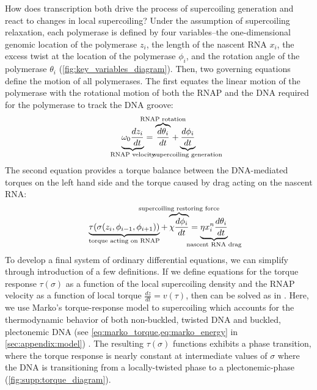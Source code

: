 \documentclass[11pt]{article}
\begin{document}
How does transcription both drive the process of supercoiling generation and react to changes in local supercoiling? Under the assumption of supercoiling relaxation, each polymerase is defined by four variables--the one-dimensional genomic location of the polymerase \(z_i\), the length of the nascent RNA \(x_i\), the excess twist at the location of the polymerase \(\phi_i\), and the rotation angle of the polymerase \(\theta_i\) (\cref{fig:key_variables_diagram}). Then, two governing equations define the motion of all polymerases.\parencite{sevierPropertiesGeneExpression2018} The first equates the linear motion of the polymerase with the rotational motion of both the RNAP and the DNA required for the polymerase to track the DNA groove:
\begin{equation}
    \underbrace{\omega_0 \frac{dz_i}{dt}}_{\mathclap{\text{RNAP velocity}}} = \overbrace{\frac{d\theta_i}{dt}}^{\mathclap{\text{RNAP rotation}}} + \underbrace{\frac{d\phi_i}{dt}}_{\mathclap{\text{supercoiling generation}}}
\label{eq:linear_rotational_balance}
\end{equation}
The second equation provides a torque balance between the DNA-mediated torques on the left hand side and the torque caused by drag acting on the nascent RNA:
\begin{equation}
    \underbrace{\tau(\sigma(z_i, \phi_{i-1}, \phi_{i+1}))}_{\mathclap{\text{torque acting on RNAP}}} + \overbrace{\chi \frac{d\phi_i}{dt}}^{\mathclap{\text{supercoiling restoring force}}}= \underbrace{\eta x_i^n \frac{d\theta_i}{dt}}_{\mathclap{\text{nascent RNA drag}}}
\label{eq:torque_balance}
\end{equation}
To develop a final system of ordinary differential equations, we can simplify through introduction of a few definitions. If we define equations for the torque response \(\tau(\sigma)\) as a function of the local supercoiling density and the RNAP velocity as a function of local torque \(\frac{dz}{dt} = v(\tau)\), then  can be solved as in \textcite{sevierPropertiesGeneExpression2018}. Here, we use Marko's torque-response model to supercoiling which accounts for the thermodynamic behavior of both non-buckled, twisted DNA and buckled, plectonemic DNA (see \cref{eq:marko_torque,eq:marko_energy} in \cref{sec:appendix:model}) \parencite{markoTorqueDynamicsLinking2007}. The resulting \(\tau(\sigma)\) functions exhibits a phase transition, where the torque response is nearly constant at intermediate values of \(\sigma\) where the DNA is transitioning from a locally-twisted phase to a plectonemic-phase (\cref{fig:supp:torque_diagram}).
\end{document}
